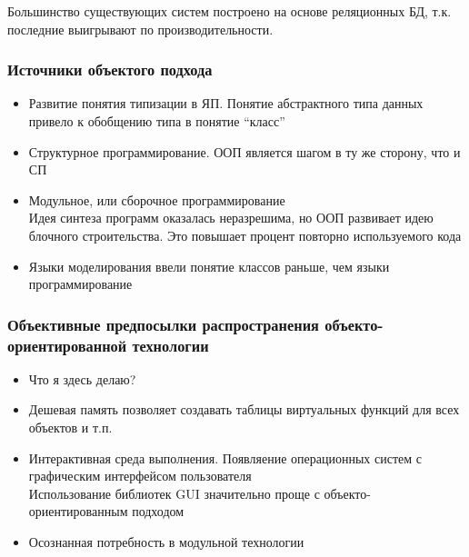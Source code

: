 \documentclass[a4paper, 14pt]{extarticle}
\begin{document}
Большинство существующих систем построено на основе реляционных БД, т.к. последние выигрывают по производительности.

\subsubsection*{Источники объектого подхода}
\begin{itemize}
    \item Развитие понятия типизации в ЯП. Понятие абстрактного типа данных привело к обобщению типа в понятие ``класс''
    \item Структурное программирование. ООП является шагом в ту же сторону, что и СП
    \item Модульное, или сборочное программирование\\
    Идея синтеза программ оказалась неразрешима, но ООП развивает идею блочного строительства. Это повышает процент повторно используемого кода
    \item Языки моделирования ввели понятие классов раньше, чем языки программирование
\end{itemize}

\subsubsection*{Объективные предпосылки распространения объекто-ориентированной технологии}
\begin{itemize}
    \item Что я здесь делаю?
    \item Дешевая память позволяет создавать таблицы виртуальных функций для всех объектов и т.п.
    \item Интерактивная среда выполнения. Появляение операционных систем с графическим интерфейсом пользователя\\
    Использование библиотек GUI значительно проще с объекто-ориентированным подходом
    \item Осознанная потребность в модульной технологии

\end{itemize}
\end{document}
